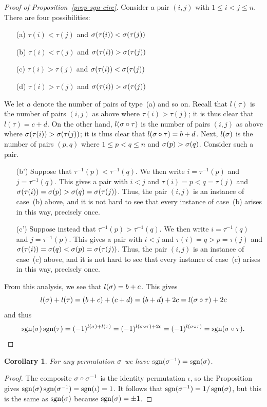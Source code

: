 \documentclass[reqno]{amsart}
\newtheorem{corollary}[theorem]{Corollary}
\theoremstyle{definition}
\begin{document}
\begin{proof}[Proof of Proposition~\ref{prop-sgn-circ}]
 Consider a pair $(i,j)$ with $1\leq i<j\leq n$.  There are four
 possibilities:
 \begin{itemize}
  \item[(a)] $\tau(i)<\tau(j)$ and $\sigma(\tau(i))<\sigma(\tau(j))$
  \item[(b)] $\tau(i)<\tau(j)$ and $\sigma(\tau(i))>\sigma(\tau(j))$
  \item[(c)] $\tau(i)>\tau(j)$ and $\sigma(\tau(i))<\sigma(\tau(j))$
  \item[(d)] $\tau(i)>\tau(j)$ and $\sigma(\tau(i))>\sigma(\tau(j))$
 \end{itemize}
 We let $a$ denote the number of pairs of type~(a) and so on.  Recall
 that $l(\tau)$ is the number of pairs $(i,j)$ as above where
 $\tau(i)>\tau(j)$; it is thus clear that $l(\tau)=c+d$.  On the other
 hand, $l(\sigma\circ\tau)$ is the number of pairs $(i,j)$ as above where
 $\sigma(\tau(i))>\sigma(\tau(j))$; it is thus clear that
 $l(\sigma\circ\tau)=b+d$.  Next, $l(\sigma)$ is the number of pairs $(p,q)$
 where $1\leq p<q\leq n$ and $\sigma(p)>\sigma(q)$.  Consider such a pair.
 \begin{itemize}
  \item[(b')] Suppose that $\tau^{-1}(p)<\tau^{-1}(q)$.  We then write
   $i=\tau^{-1}(p)$ and $j=\tau^{-1}(q)$.  This gives a pair with
   $i<j$ and $\tau(i)=p<q=\tau(j)$ and
   $\sigma(\tau(i))=\sigma(p)>\sigma(q)=\sigma(\tau(j))$.  Thus, the pair $(i,j)$
   is an instance of case~(b) above, and it is not hard to see that
   every instance of case~(b) arises in this way, precisely once.
  \item[(c')] Suppose instead that $\tau^{-1}(p)>\tau^{-1}(q)$.  We
   then write $i=\tau^{-1}(q)$ and $j=\tau^{-1}(p)$.  This gives a
   pair with $i<j$ and $\tau(i)=q>p=\tau(j)$ and
   $\sigma(\tau(i))=\sigma(q)<\sigma(p)=\sigma(\tau(j))$.  Thus, the pair $(i,j)$
   is an instance of case~(c) above, and it is not hard to see that
   every instance of case~(c) arises in this way, precisely once.
 \end{itemize}
 From this analysis, we see that $l(\sigma)=b+c$.  This gives
 \[ l(\sigma)+l(\tau) = (b+c)+(c+d) = (b+d) + 2c = l(\sigma\circ\tau) + 2c \]
 and thus
 \[ \operatorname{sgn}(\sigma)\operatorname{sgn}(\tau) = (-1)^{l(\sigma)+l(\tau)} =
     (-1)^{l(\sigma\circ\tau)+2c} = (-1)^{l(\sigma\circ\tau)} =
      \operatorname{sgn}(\sigma\circ\tau).
 \]
\end{proof}
\begin{corollary}\label{cor-sgn-inverse}
 For any permutation $\sigma$ we have $\operatorname{sgn}(\sigma^{-1})=\operatorname{sgn}(\sigma)$.
\end{corollary}
\begin{proof}
 The composite $\sigma\circ\sigma^{-1}$ is the identity permutation $\iota$,
 so the Proposition gives $\operatorname{sgn}(\sigma)\operatorname{sgn}(\sigma^{-1})=\operatorname{sgn}(\iota)=1$.  It
 follows that $\operatorname{sgn}(\sigma^{-1})=1/\operatorname{sgn}(\sigma)$, but this is the same as
 $\operatorname{sgn}(\sigma)$ because $\operatorname{sgn}(\sigma)=\pm 1$.
\end{proof}
\end{document}
